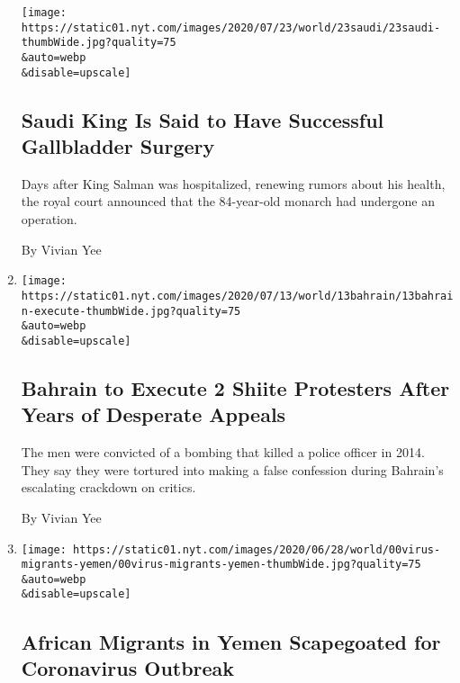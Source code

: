 \begin{enumerate}
  \texttt{[image: https://static01.nyt.com/images/2020/07/23/world/23saudi/23saudi-thumbWide.jpg?quality=75\\\&auto=webp\\\&disable=upscale]}

  \hypertarget{saudi-king-is-said-to-have-successful-gallbladder-surgery}{%
  \subsection{Saudi King Is Said to Have Successful Gallbladder
  Surgery}\label{saudi-king-is-said-to-have-successful-gallbladder-surgery}}

  Days after King Salman was hospitalized, renewing rumors about his
  health, the royal court announced that the 84-year-old monarch had
  undergone an operation.

  By Vivian Yee
\item
  \href{/2020/07/13/world/middleeast/bahrain-execute-shiite-torture-confession.html}{}

  \texttt{[image: https://static01.nyt.com/images/2020/07/13/world/13bahrain/13bahrain-execute-thumbWide.jpg?quality=75\\\&auto=webp\\\&disable=upscale]}

  \hypertarget{bahrain-to-execute-2-shiite-protesters-after-years-of-desperate-appeals}{%
  \subsection{Bahrain to Execute 2 Shiite Protesters After Years of
  Desperate
  Appeals}\label{bahrain-to-execute-2-shiite-protesters-after-years-of-desperate-appeals}}

  The men were convicted of a bombing that killed a police officer in
  2014. They say they were tortured into making a false confession
  during Bahrain's escalating crackdown on critics.

  By Vivian Yee
\item
  \href{/2020/06/28/world/middleeast/coronavirus-yemen-african-migrants.html}{}

  \texttt{[image: https://static01.nyt.com/images/2020/06/28/world/00virus-migrants-yemen/00virus-migrants-yemen-thumbWide.jpg?quality=75\\\&auto=webp\\\&disable=upscale]}

  \hypertarget{african-migrants-in-yemen-scapegoated-for-coronavirus-outbreak}{%
  \subsection{African Migrants in Yemen Scapegoated for Coronavirus
  Outbreak}\label{african-migrants-in-yemen-scapegoated-for-coronavirus-outbreak}}


\end{enumerate}
